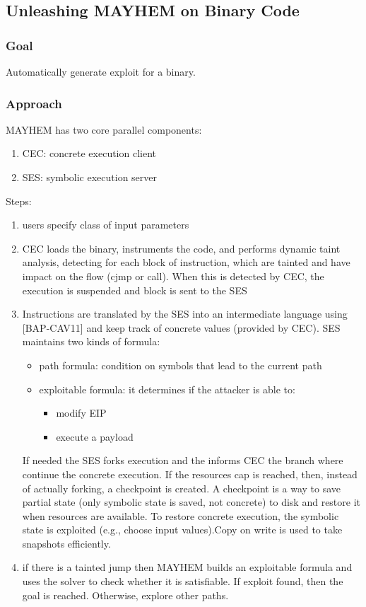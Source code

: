 \documentclass[10pt, a4paper]{article}
\begin{document}
\subsection{\cite{MAYHEM-SP12} Unleashing MAYHEM on Binary Code} 

\subsubsection{Goal}
Automatically generate exploit for a binary.

\subsubsection{Approach}      
MAYHEM has two core parallel components:
\begin{enumerate}
  \item CEC: concrete execution client
  \item SES: symbolic execution server
\end{enumerate}

Steps:
\begin{enumerate}
  \item users specify class of input parameters
  \item CEC loads the binary, instruments the code, and performs dynamic taint analysis, detecting for each block of instruction, which are tainted and have impact on the flow (cjmp or call). When this is detected by CEC, the execution is suspended and block is sent to the SES
  \item Instructions are translated by the SES into an intermediate language using [BAP-CAV11] and keep track of concrete values (provided by CEC). SES maintains two kinds of formula:
  \begin{itemize}
    \item path formula: condition on symbols that lead to the current path
    \item exploitable formula: it determines if the attacker is able to:
    \begin{itemize}
      \item modify EIP
      \item execute a payload
    \end{itemize}
  \end{itemize}
  If needed the SES forks execution and the informs CEC the branch where continue the concrete execution. If the resources cap is reached, then, instead of actually forking, a checkpoint is created. A checkpoint is a way to save partial state (only symbolic state is saved, not concrete) to disk and restore it when resources are available. To restore concrete execution, the symbolic state is exploited (e.g., choose input values).Copy on write is used to take snapshots efficiently.
  \item if there is a tainted jump then MAYHEM builds an exploitable formula and uses the solver to check whether it is satisfiable. If exploit found, then the goal is reached. Otherwise, explore other paths.
\end{enumerate}
\end{document}
